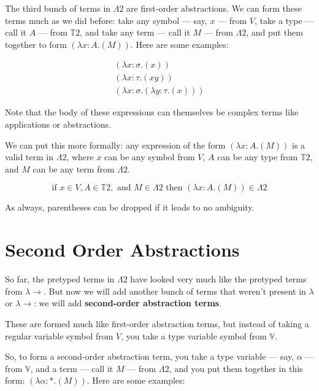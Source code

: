 \documentclass{book}
\numberwithin{equation}{chapter}
\newcommand{\vocab}{\textbf}
\begin{document}
The third bunch of terms in $\Lambda 2$ are first-order abstractions. We can form these terms much as we did before: take any symbol --- say, $x$ --- from $V$, take a type --- call it $A$ --- from $\mathbb{T}2$, and take any term --- call it $M$ --- from $\Lambda 2$, and put them together to form $(\lambda x : A.(M))$. Here are some examples:

\begin{align}
  (\lambda x : \sigma.(x)) \\
  (\lambda x : \tau.(x y)) \\
  (\lambda x : \sigma.(\lambda y : \tau.(x)))
\end{align}

\noindent
Note that the body of these expressions can themselves be complex terms like applications or abstractions.

We can put this more formally: any expression of the form $(\lambda x : A.(M))$ is a valid term in $\Lambda 2$, where $x$ can be any symbol from $V$, $A$ can be any type from $\mathbb{T}2$,  and $M$ can be any term from $\Lambda 2$.

\begin{equation}
\text{if } x \in V, A \in \mathbb{T}2, \text{ and } M \in \Lambda 2  \text{ then } (\lambda x : A.(M)) \in \Lambda 2 
\end{equation}

\noindent
As always, parentheses can be dropped if it leads to no ambiguity.


\section{Second Order Abstractions}

So far, the pretyped terms in $\Lambda 2$ have looked very much like the pretyped terms from $\lambda \rightarrow$. But now we will add another bunch of terms that weren't present in $\lambda$ or $\lambda \rightarrow$: we will add \vocab{second-order abstraction terms}.

These are formed much like first-order abstraction terms, but instead of taking a regular variable symbol from $V$, you take a type variable symbol from $\mathbb{V}$.

So, to form a second-order abstraction term, you take a type variable --- say, $\alpha$ --- from $\mathbb{V}$, and a term --- call it $M$ --- from $\Lambda 2$, and you put them together in this form: $(\lambda \alpha : *.(M))$. Here are some examples:
\end{document}
